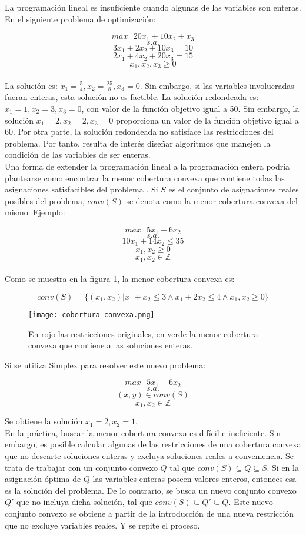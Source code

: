 \documentclass[12pt]{report}
\begin{document}
La programación lineal es insuficiente cuando algunas de las variables son enteras. En el siguiente problema de optimización:

$$max \text{ } 20x_1+10x_2+x_3$$
$$s.a.$$
$$3x_1+2x_2+10x_3=10$$
$$2x_1+4x_2+20x_3=15$$
$$x_1,x_2,x_3\geq 0$$\\

La solución es: $x_1 = \frac54,x_2 = \frac{25}{8},x_3 = 0$. Sin embargo, si las variables involucradas fueran enteras, esta solución no es factible. La solución redondeada es: $x_1 = 1,x_2 = 3,x_3 = 0$, con valor de la función objetivo igual a 50. Sin embargo, la solución $x_1 = 2,x_2 = 2,x_3 = 0$ proporciona un valor de la función objetivo igual a 60. Por otra parte, la solución redondeada no satisface las restricciones del problema. Por tanto, resulta de interés diseñar algoritmos que manejen la condición de las variables de ser enteras.\\

Una forma de extender la programación lineal a la programación entera podría plantearse como encontrar la menor cobertura convexa que contiene todas las asignaciones satisfacibles del problema \cite{Gomory}. Si $S$ es el conjunto de asignaciones reales posibles del problema, $conv(S)$ se denota como la menor cobertura convexa del mismo. Ejemplo:

$$max \text{ } 5x_1+6x_2$$
$$s.a.$$
$$10x_1+14x_2 \leq  35$$
$$x_1,x_2\geq 0$$
$$x_1,x_2\in\mathbb{Z}$$\\

Como se muestra en la figura \ref{fig:cobertura convexa}, la menor cobertura convexa es:

$$conv(S)=\{(x_1,x_2)|x_1+x_2\leq 3 \land x_1+2x_2\leq 4 \land x_1,x_2\geq 0\}$$

\begin{figure}[ht]
    \centering
    \texttt{[image: cobertura convexa.png]}
    \caption{En rojo las restricciones originales, en verde la menor cobertura convexa que contiene a las soluciones enteras.}
    \label{fig:cobertura convexa}
\end{figure}

Si se utiliza Simplex para resolver este nuevo problema:

$$max \text{ } 5x_1+6x_2$$
$$s.a.$$
$$(x,y) \in conv(S)$$
$$x_1,x_2\in\mathbb{Z}$$

Se obtiene la solución $x_1=2, x_2=1$.\\

En la práctica, buscar la menor cobertura convexa es difícil e ineficiente. Sin embargo, es posible calcular algunas de las restricciones de una cobertura convexa que no descarte soluciones enteras y excluya soluciones reales a conveniencia. Se trata de trabajar con un conjunto convexo $Q$ tal que $conv(S)\subseteq Q\subseteq S$. Si en la asignación óptima de $Q$ las variables enteras poseen valores enteros, entonces esa es la solución del problema. De lo contrario, se busca un nuevo conjunto convexo $Q'$ que no incluya dicha solución, tal que $conv(S)\subseteq Q'\subseteq Q$. Este nuevo conjunto convexo se obtiene a partir de la introducción de una nueva restricción que no excluye variables reales. Y se repite el proceso.\\
\end{document}
